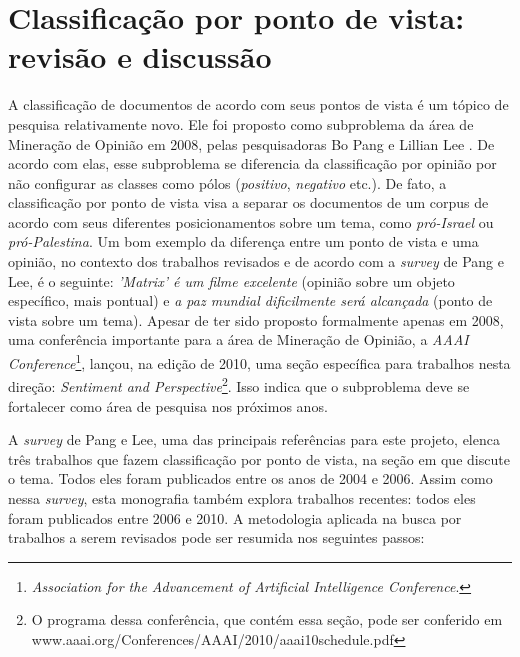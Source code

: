 \chapter{Classificação por ponto de vista: revisão e discussão}
\label{chap3}

A classificação de documentos de acordo com seus pontos de vista é um tópico de pesquisa relativamente novo. Ele foi proposto como subproblema da área de Mineração de Opinião em 2008, pelas pesquisadoras Bo Pang e Lillian Lee \cite{omsa}. De acordo com elas, esse subproblema se diferencia da classificação por opinião por não configurar as classes como pólos (\emph{positivo}, \emph{negativo} etc.). De fato, a classificação por ponto de vista visa a separar os documentos de um corpus de acordo com seus diferentes posicionamentos sobre um tema, como \emph{pró-Israel} ou \emph{pró-Palestina}. Um bom exemplo da diferença entre um ponto de vista e uma opinião, no contexto dos trabalhos revisados e de acordo com a \emph{survey} de Pang e Lee, é o seguinte: \emph{'Matrix' é um filme excelente} (opinião sobre um objeto específico, mais pontual) e \emph{a paz mundial dificilmente será alcançada} (ponto de vista sobre um tema). Apesar de ter sido proposto formalmente apenas em 2008, uma conferência importante para a área de Mineração de Opinião, a \emph{AAAI  Conference}\footnote{\emph{Association for the Advancement of Artificial Intelligence Conference}.}, lançou, na edição de 2010, uma seção específica para trabalhos nesta direção: \emph{Sentiment and Perspective}\footnote{O programa dessa conferência, que contém essa seção, pode ser conferido em www.aaai.org/Conferences/AAAI/2010/aaai10schedule.pdf}. Isso indica que o subproblema deve se fortalecer como área de pesquisa nos próximos anos.

A \emph{survey} de Pang e Lee, uma das principais referências para este projeto, elenca três trabalhos que fazem classificação por ponto de vista, na seção em que discute o tema. Todos eles foram publicados entre os anos de 2004 e 2006. Assim como nessa \emph{survey}, esta monografia também explora trabalhos recentes: todos eles foram publicados entre 2006 e 2010. A metodologia aplicada na busca por trabalhos a serem revisados pode ser resumida nos seguintes passos:

